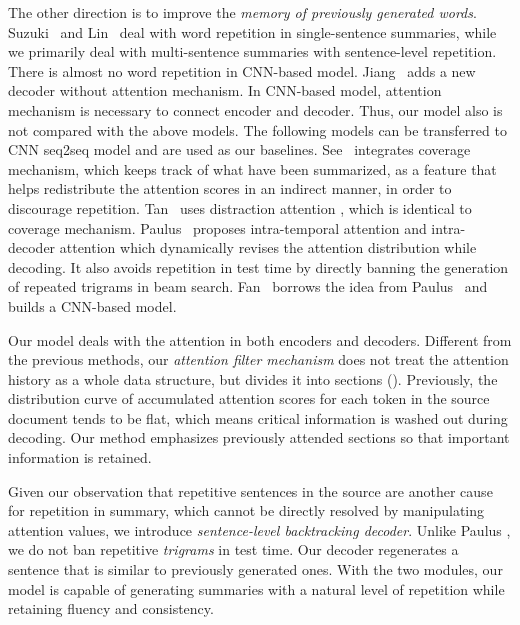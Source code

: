 The other direction is to improve the 
{\em memory of previously generated words}.
Suzuki~ and Lin~ 
deal with word repetition in single-sentence summaries, 
while we primarily deal with multi-sentence summaries with 
sentence-level repetition. 
There is almost no word repetition in CNN-based model.
Jiang~ adds a new decoder without attention mechanism.
In CNN-based model, attention mechanism is necessary to connect encoder 
and decoder.
Thus, our model also is not compared with the above models. 
The following models can be transferred to CNN seq2seq model and
are used as our baselines.
See~ integrates coverage mechanism, 
which keeps track of what have been summarized, as a feature that helps 
redistribute the attention scores in an indirect manner,
in order to discourage repetition. 
Tan~ uses distraction attention
\cite{ChenZLWJ16}, which is identical to coverage mechanism. 
Paulus~ proposes intra-temporal attention and 
intra-decoder attention which dynamically revises the attention distribution while decoding. 
It also avoids repetition in test time by directly banning the generation of 
repeated trigrams in beam search. 
Fan~ borrows the idea from Paulus~ and builds a CNN-based model. 

Our model deals with the attention in both encoders and decoders. 
Different from the previous methods, 
our \textit{attention filter mechanism} does not 
treat the attention history as a whole data structure,  
but divides it into sections (). 
Previously, the distribution curve of accumulated attention scores 
for each token in the source document tends to be flat, 
which means critical information is washed out during decoding.
Our method emphasizes previously attended sections 
so that 
important information is retained.

Given our observation that repetitive sentences in the source are
another cause for repetition in summary, 
which cannot be directly resolved by manipulating attention values, 
we introduce \textit{sentence-level backtracking decoder}. 
Unlike Paulus , 
we do not ban repetitive \textit{trigrams} in test time. 
Our decoder regenerates a sentence that is similar to previously generated ones.
With the two modules, our model is capable of generating summaries with a
natural level of repetition while retaining fluency and consistency.
